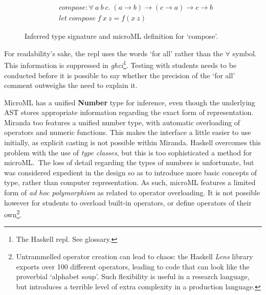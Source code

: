\documentclass[12pt, a4paper]{report}
\begin{document}
\begin{figure}
        \begin{align*}
            &compose : \forall\:a\:b\:c.\;(a \rightarrow b) \rightarrow (c \rightarrow a) \rightarrow c \rightarrow b \\
            &let\;compose\;f\:x\: z = f (x\:z)
        \end{align*}
    \caption{Inferred type signature and microML definition for `compose'.}
    \label{fig:typesig}
\end{figure}

For readability's sake, the repl uses the words `for all' rather than the $\forall$ symbol. This
information is suppressed in \textit{ghci}\footnote{The Haskell repl. See glossary. }. Testing with
students needs to be conducted before it is possible to say whether the precision of the `for all'
comment outweighs the need to explain it.

MicroML has a unified \textbf{Number} type for inference, even though the underlying AST stores
appropriate information regarding the exact form of representation. Miranda too features a unified
number type, with automatic overloading of operators and numeric functions. This makes the interface
a little easier to use initially, as explicit casting is not possible within Miranda. Haskell
overcomes this problem with the use of \textit{type classes}, but this is too sophisticated a
method for microML.\ The loss of detail regarding the types of numbers is unfortunate, but was
considered expedient in the design so as to introduce more basic concepts of type, rather than
computer representation. As such, microML features a limited form of \textit{ad hoc polymorphism}
as related to operator overloading. It is not possible however for students to overload built-in
operators, or define operators of their own\footnote{Untrammelled operator creation can lead to
chaos: the Haskell \textit{Lens} library exports over 100 different operators, leading to code that
can look like the proverbial `alphabet soup'. Such flexibility is useful in a research language, but
introduces a terrible level of extra complexity in a production language.}.
\end{document}
